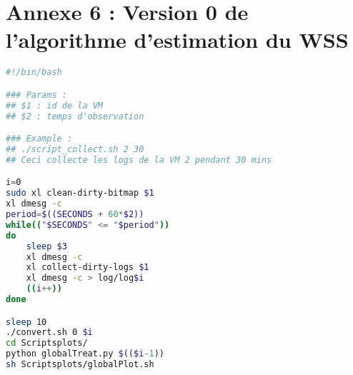 \section*{Annexe 6 : Version 0 de l'algorithme d'estimation du WSS}
\label{section:algo_v0}
\begin{lstlisting}[language=bash, caption=Script de collecte des logs, label={lst:script_collect}]
#!/bin/bash

### Params : 
## $1 : id de la VM
## $2 : temps d'observation

### Example : 
## ./script_collect.sh 2 30 
## Ceci collecte les logs de la VM 2 pendant 30 mins

i=0
sudo xl clean-dirty-bitmap $1
xl dmesg -c
period=$((SECONDS + 60*$2))
while(("$SECONDS" <= "$period"))
do
	sleep $3
	xl dmesg -c
	xl collect-dirty-logs $1
	xl dmesg -c > log/log$i
	((i++))
done

sleep 10
./convert.sh 0 $i
cd Scriptsplots/
python globalTreat.py $(($i-1))
sh Scriptsplots/globalPlot.sh
\end{lstlisting}

